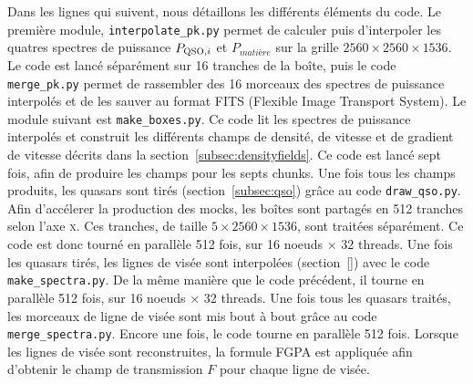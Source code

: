 \documentclass[11pt, twoside, a4paper, openright]{report}
\begin{document}
Dans les lignes qui suivent, nous détaillons les différents éléments du code. Le première module, \texttt{interpolate\_pk.py} permet de calculer puis d'interpoler les quatres spectres de puissance $P_{\textsc{QSO},i}$ et $P_{matière}$ sur la grille $\num{2560}\times\num{2560}\times\num{1536}$. Le code est lancé séparément sur 16 tranches de la boîte, puis le code \texttt{merge\_pk.py} permet de rassembler des 16 morceaux des spectres de puissance interpolés et de les sauver au format FITS (Flexible Image Transport System). Le module suivant est \texttt{make\_boxes.py}. Ce code lit les spectres de puissance interpolés et construit les différents champs de densité, de vitesse et de gradient de vitesse décrits dans la section~\ref{subsec:densityfields}. Ce code est lancé sept fois, afin de produire les champs pour les septs chunks. Une fois tous les champs produits, les quasars sont tirés (section~\ref{subsec:qso}) grâce au code \texttt{draw\_qso.py}. Afin d'accélerer la production des mocks, les boîtes sont partagés en \num{512} tranches selon l'axe \textsc{x}. Ces tranches, de taille $\num{5}\times\num{2560}\times\num{1536}$, sont traitées séparément. Ce code est donc tourné en parallèle \num{512} fois, sur 16 noeuds $\times$ 32 threads. Une fois les quasars tirés, les lignes de visée sont interpolées (section~\ref{}) avec le code \texttt{make\_spectra.py}. De la même manière que le code précédent, il tourne en parallèle \num{512} fois, sur 16 noeuds $\times$ 32 threads. Une fois tous les quasars traités, les morceaux de ligne de visée sont mis bout à bout grâce au code \texttt{merge\_spectra.py}. Encore une fois, le code tourne en parallèle \num{512} fois. Lorsque les lignes de visée sont reconstruites, la formule FGPA est appliquée afin d'obtenir le champ de transmission $F$ pour chaque ligne de visée.










\end{document}
